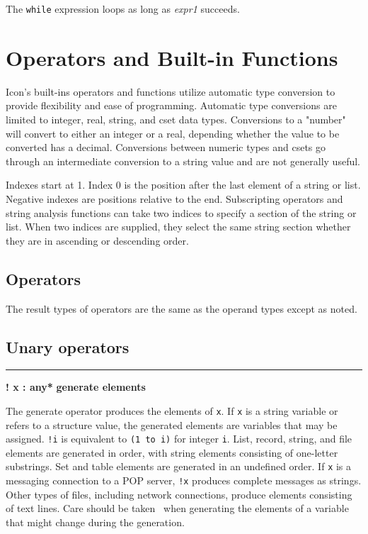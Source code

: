 \noindent
{}The \texttt{while} expression loops as long as
\textit{expr1} succeeds.

\section{Operators and Built-in Functions}

Icon's built-ins operators and functions utilize
automatic type conversion to provide flexibility and ease of
programming. Automatic type
conversions are limited to
integer, real, string, and cset data types. Conversions to a "number" will
convert to either an integer or a real, depending whether the value to
be converted has a decimal. Conversions between numeric types and csets
go through an intermediate conversion to a string value and are not
generally useful.

Indexes start at 1. Index 0 is the position after the last element of a
string or list. Negative indexes are positions
relative to the end. Subscripting operators and string analysis
functions can take two indices to specify a section of the string or
list. When two indices are supplied, they select the same string
section whether they are in ascending or descending order.

\subsection*{Operators}

The result types of operators are the same as the
operand types except as noted.

\subsection*{Unary operators}

\bigskip\hrule\vspace{0.1cm}
\noindent
{\bf ! x : any* } \hfill {\bf generate elements}

\noindent
{}The generate
operator produces the elements of \texttt{x}. If
\texttt{x} is a string variable or refers to a structure value, the
generated elements are variables that may be assigned. \texttt{!i} is
equivalent to \texttt{(1 to i)} for integer \texttt{i}. List, record,
string, and file elements are generated in order, with string elements
consisting of one-letter substrings. Set and table elements are
generated in an undefined order. If \texttt{x} is a messaging
connection to a POP server, \texttt{!x} produces complete messages as
strings. Other types of files, including network connections, produce
elements consisting of text lines.
Care should be taken \WarningNotThreadSafe\ when generating the elements
of a variable that might change during the generation.

